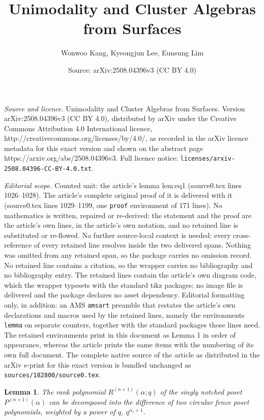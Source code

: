 \documentclass[10pt,a4paper]{amsart}
\title{Unimodality and Cluster Algebras from Surfaces}
\author{Wonwoo Kang, Kyeongjun Lee, Eunsung Lim}
\date{Source: arXiv:2508.04396v3 (CC BY 4.0)}
\newtheorem{lemma}{Lemma}
\begin{document}
\maketitle

\noindent\emph{Source and licence.} Unimodality and Cluster Algebras from Surfaces. Version arXiv:2508.04396v3 (CC BY 4.0), distributed by arXiv under the Creative Commons Attribution 4.0 International licence, http://creativecommons.org/licenses/by/4.0/, as recorded in the arXiv licence metadata for this exact version and shown on the abstract page https://arxiv.org/abs/2508.04396v3. Full licence notice: \texttt{licenses/arxiv-2508.04396-CC-BY-4.0.txt}.\par\smallskip

\noindent\textit{Editorial scope.} Counted unit: the article's lemma lem:eq1 (source0.tex lines 1026--1028). The article's complete original proof of it is delivered with it (source0.tex lines 1029--1199, one \texttt{proof} environment of 171 lines). No mathematics is written, repaired or re-derived: the statement and the proof are the article's own lines, in the article's own notation, and no retained line is substituted or re-flowed.  No further source-local context is needed: every cross-reference of every retained line resolves inside the two delivered spans.  Nothing was omitted from any retained span, so the package carries no omission record.  No retained line contains a citation, so the wrapper carries no bibliography and no bibliography entry.  The retained lines contain the article's own diagram code, which the wrapper typesets with the standard tikz packages; no image file is delivered and the package declares no asset dependency.  Editorial formatting only, in addition: an AMS \texttt{amsart} preamble that restates the article's own declarations and macros used by the retained lines, namely the environments \texttt{lemma} on separate counters, together with the standard packages those lines need.  The retained environments print in this document as Lemma 1 in order of appearance, whereas the article prints the same items with the numbering of its own full document.  The complete native source of the article as distributed in the arXiv e-print for this exact version is bundled unchanged as \texttt{sources/182800/source0.tex}.
\begin{lemma}\label{lem:eq1}
    The rank polynomial $R^{(n+1)}(\alpha; q)$ of the singly notched poset $P^{(n+1)}(\alpha)$ can be decomposed into the difference of two circular fence poset polynomials, weighted by a power of $q$, $q^{\alpha_s+1}$.
\end{lemma}
\end{document}

